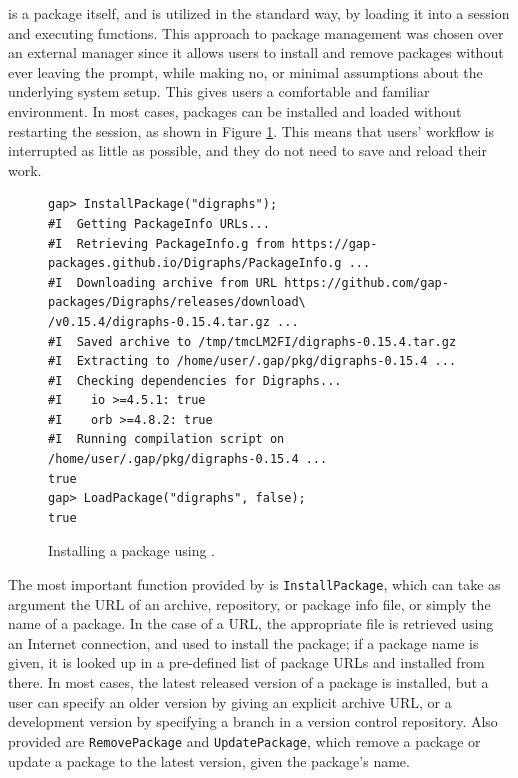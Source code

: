  is a \GAP package itself, and is utilized in the
standard way, by loading it into a \GAP session and executing \GAP
functions. This approach to package management was chosen over an external
manager since it allows users to install and remove packages without ever
leaving the \GAP prompt, while making no, or minimal assumptions about
the underlying system setup. This gives
users a comfortable and familiar environment. In most cases, packages can be installed
and loaded without restarting the session, as shown in Figure \ref{fig:pkgman-sample-b}.
This means that users' workflow is interrupted as little as possible, and they do
not need to save and reload their work.

\begin{figure}[!ht]
  \begin{mdframed}
    \centering
    {\tiny
\begin{verbatim}
gap> InstallPackage("digraphs");
#I  Getting PackageInfo URLs...
#I  Retrieving PackageInfo.g from https://gap-packages.github.io/Digraphs/PackageInfo.g ...
#I  Downloading archive from URL https://github.com/gap-packages/Digraphs/releases/download\
/v0.15.4/digraphs-0.15.4.tar.gz ...
#I  Saved archive to /tmp/tmcLM2FI/digraphs-0.15.4.tar.gz
#I  Extracting to /home/user/.gap/pkg/digraphs-0.15.4 ...
#I  Checking dependencies for Digraphs...
#I    io >=4.5.1: true
#I    orb >=4.8.2: true
#I  Running compilation script on /home/user/.gap/pkg/digraphs-0.15.4 ...
true
gap> LoadPackage("digraphs", false);
true
\end{verbatim}
    }
    \end{mdframed}
    \caption{Installing a package using .}
    \label{fig:pkgman-sample-b}
\end{figure}

The most important function provided by  is
\texttt{InstallPackage}, which can take as argument the URL of an archive, repository, or package info file, or simply the
name of a package.  In the case of a URL, the appropriate file is retrieved
using an Internet connection, and used to install the package; if a package name
is given, it is looked up in a pre-defined list of package URLs and installed
from there.  In most cases, the latest released version of a package is
installed, but a user can specify an older version by giving an explicit archive
URL, or a development version by specifying a branch in a
version control repository.
Also provided are \texttt{RemovePackage} and \texttt{UpdatePackage}, which
remove a package or update a package to the latest version, given the package's
name.

